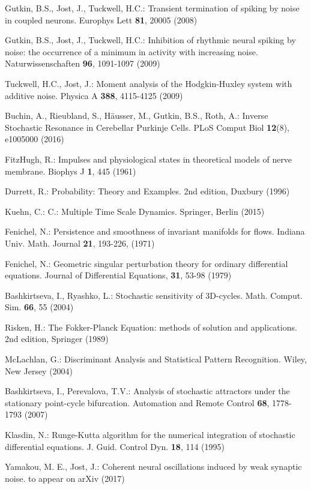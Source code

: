 \begin{thebibliography}{00}
 Gutkin, B.S., Jost, J., Tuckwell, H.C.: Transient termination of spiking
by noise in coupled neurons. Europhys Lett \textbf{81}, 20005 (2008)

 Gutkin, B.S., Jost, J., Tuckwell, H.C.: Inhibition of rhythmic neural spiking by noise:
the occurrence of a minimum in activity with increasing noise. Naturwissenschaften \textbf{96}, 1091-1097
(2009)

 Tuckwell, H.C., Jost, J.: Moment analysis of the Hodgkin-Huxley system with additive noise. Physica A \textbf{388}, 4115-4125
(2009)

 Buchin, A., Rieubland, S., H\"{a}usser, M., Gutkin, B.S., Roth, A.: 
Inverse Stochastic Resonance in Cerebellar
Purkinje Cells. PLoS Comput Biol \textbf{12}(8),
e1005000 (2016)

 FitzHugh, R.: Impulses and physiological states in theoretical
models of nerve membrane. Biophys J \textbf{1}, 445 (1961)

 Durrett, R.: Probability: Theory and Examples. 2nd edition, Duxbury (1996)

 Kuehn, C.: C.: Multiple Time Scale Dynamics. Springer, Berlin (2015)

 Fenichel, N.: Persistence and smoothness of invariant manifolds for flows.
Indiana Univ. Math. Journal \textbf{21}, 193-226, (1971)

 Fenichel, N.: Geometric singular perturbation theory for ordinary differential equations.
Journal of Differential Equations, \textbf{31}, 53-98 (1979)

 Bashkirtseva, I.,  Ryashko, L.: Stochastic sensitivity 
of 3D-cycles. Math. Comput. Sim. \textbf{66},
55 (2004)

 Risken, H.: The Fokker-Planck Equation: methods of solution 
and applications. 2nd edition, Springer (1989)

 McLachlan, G.: Discriminant Analysis and Statistical Pattern
Recognition. Wiley, New Jersey (2004)

 Bashkirtseva, I., Perevalova, T.V.: Analysis of 
stochastic attractors under the stationary point-cycle bifurcation.
Automation and Remote Control \textbf{68}, 1778-1793 (2007)

 Klasdin, N.: Runge-Kutta algorithm for the
numerical integration of stochastic differential equations. J.
Guid. Control Dyn. \textbf{18}, 114 (1995)

 Yamakou, M. E., Jost, J.: Coherent neural oscillations induced by weak synaptic noise. 
to appear on arXiv (2017)

\end{thebibliography}




